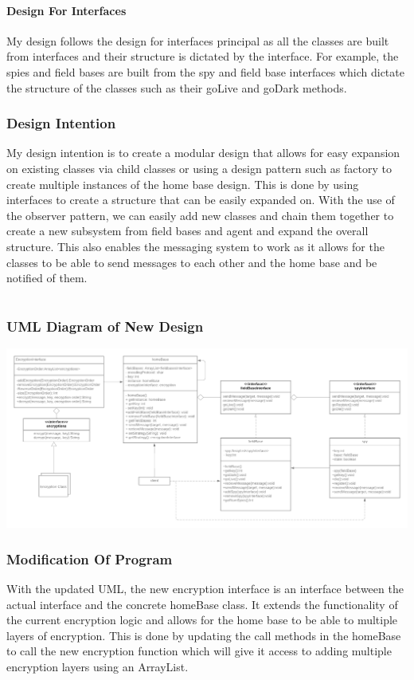 \documentclass[12pt]{article}
\begin{document}
        \subsection*{Design For Interfaces}
            My design follows the design for interfaces principal as all the classes are built from interfaces and their structure is
            dictated by the interface. For example, the spies and field bases are built from the spy and field base interfaces
            which dictate the structure of the classes such as their goLive and goDark methods. 

    \section*{Design Intention}
        My design intention is to create a modular design that allows for easy expansion on existing classes via child classes or using 
        a design pattern such as factory to create multiple instances of the home base design. This is done by using interfaces
        to create a structure that can be easily expanded on. With the use of the observer pattern, we can easily add new classes and chain them together to create a new 
        subsystem from field bases and agent and expand the overall structure. This also enables the messaging system to work as it allows for the classes to
         be able to send messages to each other and the home base and be notified of them. 

    \part{}
    \section*{UML Diagram of New Design}
        \includegraphics[scale=.24]{part2_uml}
    
    \section*{Modification Of Program}
        With the updated UML, the new encryption interface is an interface between the actual interface and the concrete
        homeBase class. It extends the functionality of the current encryption logic and allows for the home base to be able to
        multiple layers of encryption. This is done by updating the call methods in the homeBase to call the new 
        encryption function which will give it access to adding multiple encryption layers using an ArrayList. 
        
\end{document}
